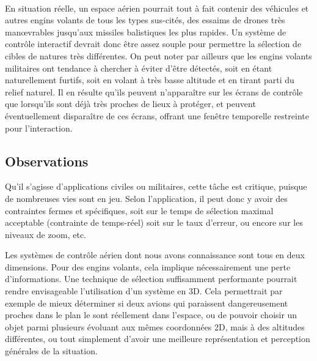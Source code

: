 	\paragraph{}
	En situation réelle, un espace aérien pourrait tout à fait contenir des véhicules et autres engins volants de tous les types sus-cités, des essaims de drones très manœvrables jusqu'aux missiles balistiques les plus rapides. Un système de contrôle interactif devrait donc être assez souple pour permettre la sélection de cibles de natures très différentes.
	On peut noter par ailleurs que les engins volants militaires ont tendance à chercher à éviter d'être détectés, soit en étant naturellement furtifs, soit en volant à très basse altitude et en tirant parti du relief naturel. Il en résulte qu'ils peuvent n'apparaître sur les écrans de contrôle que lorsqu'ils sont déjà très proches de lieux à protéger, et peuvent éventuellement disparaître de ces écrans, offrant une fenêtre temporelle restreinte pour l'interaction.
	
	\subsection{Observations}
	Qu'il s'agisse d'applications civiles ou militaires, cette tâche est critique, puisque de nombreuses vies sont en jeu. Selon l'application, il peut donc y avoir des contraintes fermes et spécifiques, soit sur le temps de sélection maximal acceptable (contrainte de temps-réel) soit sur le taux d'erreur, ou encore sur les niveaux de zoom, etc.

	Les systèmes de contrôle aérien dont nous avons connaissance sont tous en deux dimensions. Pour des engins volants, cela implique nécessairement une perte d'informations. Une technique de sélection suffisamment performante pourrait rendre envisageable l'utilisation d'un système en 3D. Cela permettrait par exemple de mieux déterminer si deux avions qui paraissent dangereusement proches dans le plan le sont réellement dans l'espace, ou de pouvoir choisir un objet parmi plusieurs évoluant aux mêmes coordonnées 2D, mais à des altitudes différentes, ou tout simplement d'avoir une meilleure représentation et perception générales de la situation.


